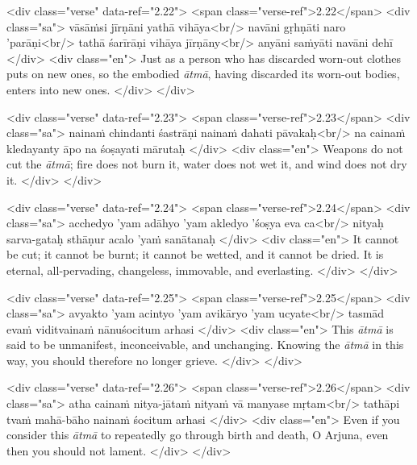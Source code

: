 \begin{html}
<div class="verse" data-ref="2.22">
  <span class="verse-ref">2.22</span>
  <div class="sa">
    vāsāṁsi jīrṇāni yathā vihāya<br/>
    navāni gṛhṇāti naro ’parāṇi<br/>
    tathā śarīrāṇi vihāya jīrṇāny<br/>
    anyāni saṁyāti navāni dehī
  </div>
  <div class="en">
    Just as a person who has discarded worn-out clothes puts on new ones, so the embodied \textit{ātmā}, having discarded its worn-out bodies, enters into new ones.
  </div>
</div>
\end{html}



\begin{html}
<div class="verse" data-ref="2.23">
  <span class="verse-ref">2.23</span>
  <div class="sa">
    nainaṁ chindanti śastrāṇi nainaṁ dahati pāvakaḥ<br/>
    na cainaṁ kledayanty āpo na śoṣayati mārutaḥ
  </div>
  <div class="en">
    Weapons do not cut the \textit{ātmā}; fire does not burn it, water does not wet it, and wind does not dry it.
  </div>
</div>
\end{html}



\begin{html}
<div class="verse" data-ref="2.24">
  <span class="verse-ref">2.24</span>
  <div class="sa">
    acchedyo ’yam adāhyo ’yam akledyo ’śoṣya eva ca<br/>
    nityaḥ sarva-gataḥ sthāṇur acalo ’yaṁ sanātanaḥ
  </div>
  <div class="en">
    It cannot be cut; it cannot be burnt; it cannot be wetted, and it cannot be dried. It is eternal, all-pervading, changeless, immovable, and everlasting.
  </div>
</div>
\end{html}



\begin{html}
<div class="verse" data-ref="2.25">
  <span class="verse-ref">2.25</span>
  <div class="sa">
    avyakto ’yam acintyo ’yam avikāryo ’yam ucyate<br/>
    tasmād evaṁ viditvainaṁ nānuśocitum arhasi
  </div>
  <div class="en">
    This \textit{ātmā} is said to be unmanifest, inconceivable, and unchanging. Knowing the \textit{ātmā} in this way, you should therefore no longer grieve.
  </div>
</div>
\end{html}



\begin{html}
<div class="verse" data-ref="2.26">
  <span class="verse-ref">2.26</span>
  <div class="sa">
    atha cainaṁ nitya-jātaṁ nityaṁ vā manyase mṛtam<br/>
    tathāpi tvaṁ mahā-bāho nainaṁ śocitum arhasi
  </div>
  <div class="en">
    Even if you consider this \textit{ātmā} to repeatedly go through birth and death, O Arjuna, even then you should not lament.
  </div>
</div>
\end{html}



